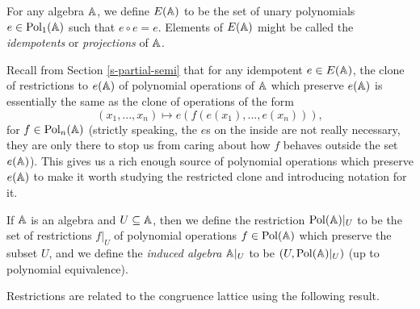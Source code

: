 \begin{appendices}
\begin{defn} For any algebra $\mathbb{A}$, we define $E(\mathbb{A})$ to be the set of unary polynomials $e \in \operatorname{Pol}_1(\mathbb{A})$ such that $e \circ e = e$. Elements of $E(\mathbb{A})$ might be called the \emph{idempotents} or \emph{projections} of $\mathbb{A}$.
\end{defn}

Recall from Section \ref{s-partial-semi} that for any idempotent $e \in E(\mathbb{A})$, the clone of restrictions to $e(\mathbb{A})$ of polynomial operations of $\mathbb{A}$ which preserve $e(\mathbb{A})$ is essentially the same as the clone of operations of the form
\[
(x_1, ..., x_n) \mapsto e(f(e(x_1), ..., e(x_n))),
\]
for $f \in \operatorname{Pol}_n(\mathbb{A})$ (strictly speaking, the $e$s on the inside are not really necessary, they are only there to stop us from caring about how $f$ behaves outside the set $e(\mathbb{A})$). This gives us a rich enough source of polynomial operations which preserve $e(\mathbb{A})$ to make it worth studying the restricted clone and introducing notation for it.

\begin{defn} If $\mathbb{A}$ is an algebra and $U \subseteq \mathbb{A}$, then we define the restriction $\operatorname{Pol}(\mathbb{A})|_U$ to be the set of restrictions $f|_U$ of polynomial operations $f \in \operatorname{Pol}(\mathbb{A})$ which preserve the subset $U$, and we define the \emph{induced algebra} $\mathbb{A}|_U$ to be $(U, \operatorname{Pol}(\mathbb{A})|_U)$ (up to polynomial equivalence).
\end{defn}

Restrictions are related to the congruence lattice using the following result.


\end{appendices}
